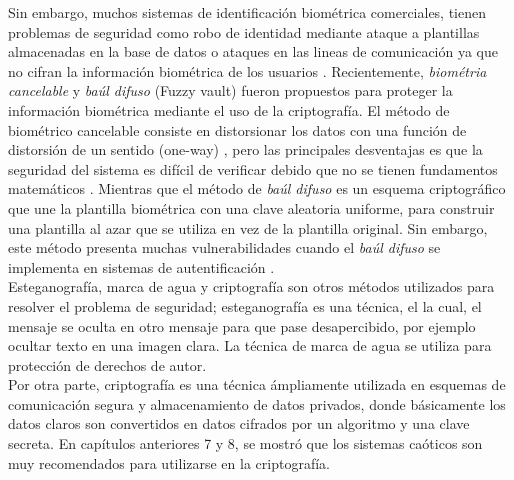 Sin embargo, muchos sistemas de identificación biométrica comerciales, tienen problemas de seguridad como robo de identidad mediante ataque a plantillas almacenadas en la base de datos o ataques en las lineas de comunicación ya que no cifran la información biométrica de los usuarios \cite{REtAl_2001}. Recientemente, \textit{biométria cancelable} y \textit{baúl difuso} (Fuzzy vault) fueron propuestos para proteger la información biométrica mediante el uso de la criptografía. El método de biométrico cancelable consiste en distorsionar los datos con una función de distorsión de un sentido (one-way) \cite{PyK_2014, JEtAl_2012}, pero las principales desventajas es que la seguridad del sistema es difícil de verificar debido que no se tienen fundamentos matemáticos \cite{KEtAl_2010}. Mientras que el método de \textit{baúl difuso} es un esquema criptográfico que une la plantilla biométrica con una clave aleatoria uniforme, para construir una plantilla al azar que se utiliza en vez de la plantilla original. Sin embargo, este método presenta muchas vulnerabilidades cuando el \textit{baúl difuso} se implementa en sistemas de autentificación \cite{NEtAl_2007}. \\

Esteganografía, marca de agua y criptografía son otros métodos utilizados para resolver el problema de seguridad; esteganografía es una técnica, el la cual, el mensaje se oculta en otro mensaje para que pase desapercibido, por ejemplo ocultar texto en una imagen clara. La técnica de marca de agua se utiliza para protección de derechos de autor.   \\

Por otra parte, criptografía es una técnica ámpliamente utilizada en esquemas de comunicación segura y almacenamiento de datos privados, donde básicamente los datos claros son convertidos en datos cifrados por un algoritmo y una clave secreta. En capítulos anteriores 7 y 8, se mostró que los sistemas caóticos son muy recomendados para utilizarse en la criptografía.  \\    

